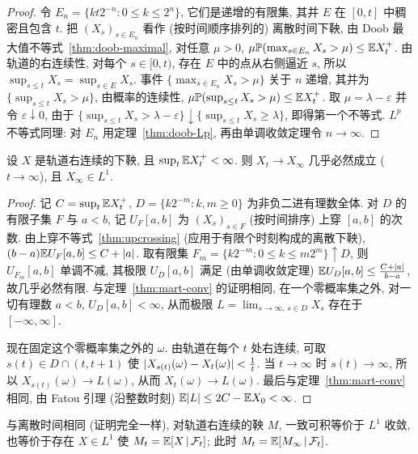 \begin{proof}
令 $E_n=\{kt2^{-n}: 0\le k\le2^n\}$, 它们是递增的有限集, 其并 $E$ 在 $[0,t]$ 中稠密且包含 $t$. 把 $(X_s)_{s\in E_n}$ 看作 (按时间顺序排列的) 离散时间下鞅, 由 Doob 最大值不等式~\ref{thm:doob-maximal}, 对任意 $\mu>0$, $\mu\mathbb{P}(\max_{s\in E_n}X_s>\mu)\le\mathbb{E} X_t^+$. 由轨道的右连续性, 对每个 $s\in[0,t)$, 存在 $E$ 中的点从右侧逼近 $s$, 所以 $\sup_{s\le t}X_s=\sup_{s\in E}X_s$. 事件 $\{\max_{s\in E_n}X_s>\mu\}$ 关于 $n$ 递增, 其并为 $\{\sup_{s\le t}X_s>\mu\}$, 由概率的连续性, $\mu\mathbb{P}(\sup_{s\le t}X_s>\mu)\le\mathbb{E} X_t^+$. 取 $\mu=\lambda-\varepsilon$ 并令 $\varepsilon\downarrow0$, 由于 $\{\sup_{s\le t}X_s>\lambda-\varepsilon\}\downarrow\{\sup_{s\le t}X_s\ge\lambda\}$, 即得第一个不等式. $L^p$ 不等式同理: 对 $E_n$ 用定理~\ref{thm:doob-Lp}, 再由单调收敛定理令 $n\to\infty$.
\end{proof}

\begin{theorem}[连续时间鞅收敛定理]\label{thm:ct-convergence}
设 $X$ 是轨道右连续的下鞅, 且 $\sup_t\mathbb{E} X_t^+<\infty$. 则 $X_t\to X_\infty$ 几乎必然成立 ($t\to\infty$), 且 $X_\infty\in L^1$.
\end{theorem}

\begin{proof}
记 $C=\sup_t\mathbb{E} X_t^+$, $D=\{k2^{-m}: k,m\ge0\}$ 为非负二进有理数全体. 对 $D$ 的有限子集 $F$ 与 $a<b$, 记 $U_F[a,b]$ 为 $(X_s)_{s\in F}$ (按时间排序) 上穿 $[a,b]$ 的次数. 由上穿不等式~\ref{thm:upcrossing} (应用于有限个时刻构成的离散下鞅), $(b-a)\mathbb{E} U_F[a,b]\le C+\lvert a\rvert$. 取有限集 $F_m=\{k2^{-m}: 0\le k\le m2^m\}\uparrow D$, 则 $U_{F_m}[a,b]$ 单调不减, 其极限 $U_D[a,b]$ 满足 (由单调收敛定理) $\mathbb{E} U_D[a,b]\le\frac{C+\lvert a\rvert}{b-a}$, 故几乎必然有限. 与定理~\ref{thm:mart-conv} 的证明相同, 在一个零概率集之外, 对一切有理数 $a<b$, $U_D[a,b]<\infty$, 从而极限 $L=\lim_{s\to\infty,\,s\in D}X_s$ 存在于 $[-\infty,\infty]$.

现在固定这个零概率集之外的 $\omega$. 由轨道在每个 $t$ 处右连续, 可取 $s(t)\in D\cap(t,t+1)$ 使 $\lvert X_{s(t)}(\omega)-X_t(\omega)\rvert<\frac{1}{t}$. 当 $t\to\infty$ 时 $s(t)\to\infty$, 所以 $X_{s(t)}(\omega)\to L(\omega)$, 从而 $X_t(\omega)\to L(\omega)$. 最后与定理~\ref{thm:mart-conv} 相同, 由 Fatou 引理 (沿整数时刻) $\mathbb{E}\lvert L\rvert\le2C-\mathbb{E} X_0<\infty$.
\end{proof}

与离散时间相同 (证明完全一样), 对轨道右连续的鞅 $M$, 一致可积等价于 $L^1$ 收敛, 也等价于存在 $X\in L^1$ 使 $M_t=\mathbb{E}[X\,|\,\mathcal{F}_t]$; 此时 $M_t=\mathbb{E}[M_\infty\,|\,\mathcal{F}_t]$.

